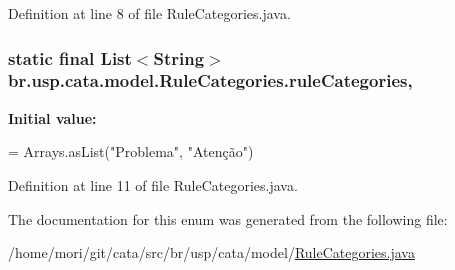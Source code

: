 Definition at line 8 of file Rule\+Categories.\+java.

\hypertarget{enumbr_1_1usp_1_1cata_1_1model_1_1_rule_categories_abbf38679d4fb70dd7eec1ea86f346f58}{
\subsubsection[{rule\+Categories}]{\setlength{\rightskip}{0pt plus 5cm} static  final List$<$String$>$ br.\+usp.\+cata.\+model.\+Rule\+Categories.\+rule\+Categories\hspace{0.3cm}{\ttfamily [static]}, {\ttfamily [private]}}}\label{enumbr_1_1usp_1_1cata_1_1model_1_1_rule_categories_abbf38679d4fb70dd7eec1ea86f346f58}
{\bfseries Initial value\+:}
\begin{DoxyCode}
=
        Arrays.asList(\textcolor{stringliteral}{"Problema"}, \textcolor{stringliteral}{"Atenção"})
\end{DoxyCode}


Definition at line 11 of file Rule\+Categories.\+java.



The documentation for this enum was generated from the following file\+:\begin{DoxyCompactItemize}
\item 
/home/mori/git/cata/src/br/usp/cata/model/\hyperlink{_rule_categories_8java}{Rule\+Categories.\+java}\end{DoxyCompactItemize}
